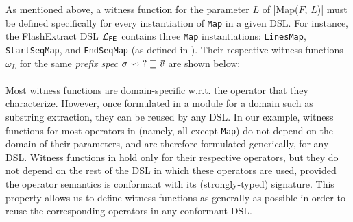 \begin{example}
    As mentioned above, a witness function for the parameter $L$ of \dslinline|Map($F$, $L$)| must be defined
    specifically for every instantiation of \texttt{Map} in a given DSL.
    For instance, the FlashExtract DSL $\mathcal{L}_{\mathsf{FE}}$ contains three \texttt{Map} instantiations: \texttt{LinesMap},
    \texttt{StartSeqMap}, and \texttt{EndSeqMap} (as defined in ).
    Their respective witness functions $\omega_L$ for the same \emph{prefix spec} $\sigma \rightsquigarrow \mathbf{?} \sqsupseteq
    \vec{v}$ are shown below:

    \vspace{0.5\baselineskip}
\end{example}

\paragraph{}
Most witness functions are domain-specific w.r.t.  the operator that they characterize.
However, once formulated in a module for a domain such as substring extraction, they can be reused by any DSL.
In our example, witness functions for most operators in  (namely, all except \texttt{Map}) do not
depend on the domain of their parameters, and are therefore formulated generically, for any DSL.
Witness functions in  hold only for their respective operators, but they do
not depend on the rest of the DSL in which these operators are used, provided the operator semantics is conformant with
its (strongly-typed) signature.
This property allows us to define witness functions as generally as possible in order to reuse the corresponding
operators in any conformant DSL.
